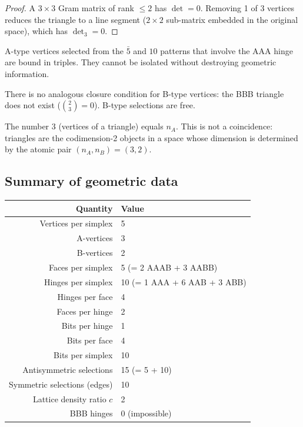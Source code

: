 \begin{proof}
A $3 \times 3$ Gram matrix of rank $\leq 2$ has $\det = 0$. Removing 1 of 3 vertices reduces the triangle to a line segment ($2 \times 2$ sub-matrix embedded in the original space), which has $\det_3 = 0$.
\end{proof}

\begin{corollary}
A-type vertices selected from the $\bar{5}$ and $10$ patterns that involve the AAA hinge are bound in triples. They cannot be isolated without destroying geometric information.
\end{corollary}

\begin{theorem}
There is no analogous closure condition for B-type vertices: the BBB triangle does not exist ($\binom{2}{3} = 0$). B-type selections are free.
\end{theorem}

\begin{remark}
The number 3 (vertices of a triangle) equals $n_A$. This is not a coincidence: triangles are the codimension-2 objects in a space whose dimension is determined by the atomic pair $(n_A, n_B) = (3, 2)$.
\end{remark}

\subsection{Summary of geometric data}

\begin{center}
\begin{tabular}{rl}
\hline
Quantity & Value \\
\hline
Vertices per simplex & 5 \\
A-vertices & 3 \\
B-vertices & 2 \\
Faces per simplex & 5 (= 2 AAAB + 3 AABB) \\
Hinges per simplex & 10 (= 1 AAA + 6 AAB + 3 ABB) \\
Hinges per face & 4 \\
Faces per hinge & 2 \\
Bits per hinge & 1 \\
Bits per face & 4 \\
Bits per simplex & 10 \\
Antisymmetric selections & 15 (= 5 + 10) \\
Symmetric selections (edges) & 10 \\
Lattice density ratio $c$ & 2 \\
BBB hinges & 0 (impossible) \\
\hline
\end{tabular}
\end{center}

